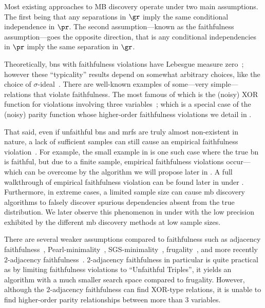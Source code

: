 \documentclass[accepted]{uai2026} %
\theoremstyle{plain}
\theoremstyle{definition}
\theoremstyle{remark}
\begin{document}
Most existing approaches to MB discovery operate under two main
assumptions. The first being that any separations in $\gr$ imply the
same conditional independence in $\pr$. The second assumption---known as
the faithfulness assumption---goes the opposite direction, that is any
conditional independencies in $\pr$ imply the same separation in $\gr$.

Theoretically, \glspl{bn} with faithfulness violations have Lebesgue
measure zero~\citep{meek1995,spirtes2001,boeken2025}; however these
``typicality'' results depend on somewhat arbitrary choices, like the
choice of $\sigma$-ideal~\citep{boeken2025}. There are well-known
examples of some---very simple---relations that violate
faithfulness. The most famous of which is the (noisy) XOR function for
violations involving three variables~\citep{inazumi2011,marx2021}; which
is a special case of the (noisy) parity function whose higher-order
faithfulness violations we detail in .

That said, even if unfaithful \glspl{bn} and \glspl{mrf} are truly
almost non-existent in nature, a lack of sufficient samples can still
cause an empirical faithfulness
violation~\citep{uhler2013,lemeire2012,boeken2025}. For example, the
small example in  is one such case where the true
\gls{bn} is faithful, but due to a finite sample, empirical faithfulness
violations occur---which can be overcome by the algorithm we will
propose later in .  A full walkthrough of empirical
faithfulness violation can be found later in  under
.  Furthermore, in extreme cases, a limited sample
size can cause \gls{mb} discovery algorithms to falsely discover
spurious dependencies absent from the true distribution. We later observe
this phenomenon in  under  with
the low precision exhibited by the different \gls{mb} discovery methods
at low sample sizes.


There are several weaker assumptions compared to faithfulness such as
adjacency faithfulness~\citep{spirtes2001},
Pearl-minimality~\citep{pearl1988,pearl2009},
SGS-minimality~\citep{spirtes2001}, frugality~\citep{forster2018}, and
more recently $2$-adjacency faithfulness~\citep{marx2021}.
$2$-adjacency faithfulness in particular is quite practical as by
limiting faithfulness violations to ``Unfaithful Triples'', it yields an
algorithm with a much smaller search space compared to
frugality. However, although the $2$-adjacency faithfulness can find
XOR-type relations, it is unable to find higher-order parity
relationships between more than $3$ variables.
\end{document}
